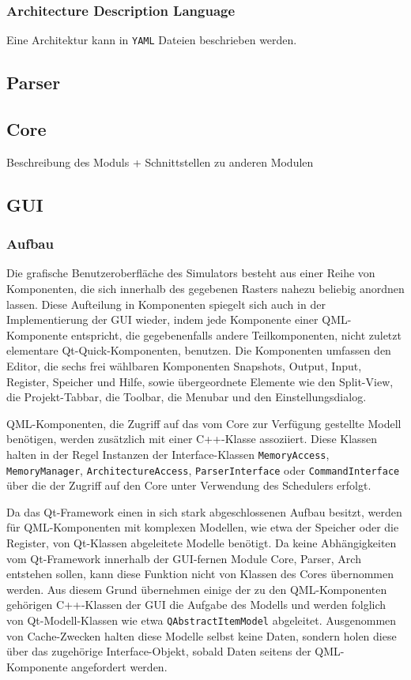 \subsubsection{Architecture Description Language}

Eine Architektur kann in \texttt{YAML} Dateien beschrieben werden.


\subsection{Parser}

\subsection{Core}

Beschreibung des Moduls + Schnittstellen zu anderen Modulen

\subsection{GUI}


\subsubsection{Aufbau}

Die grafische Benutzeroberfläche des Simulators besteht aus einer Reihe von Komponenten, die sich innerhalb des gegebenen Rasters nahezu beliebig anordnen lassen. Diese Aufteilung in Komponenten spiegelt sich auch in der Implementierung der GUI wieder, indem jede Komponente einer QML-Komponente entspricht, die gegebenenfalls andere Teilkomponenten, nicht zuletzt elementare Qt-Quick-Komponenten, benutzen. Die Komponenten umfassen den Editor, die sechs frei wählbaren Komponenten Snapshots, Output, Input, Register, Speicher und Hilfe, sowie übergeordnete Elemente wie den Split-View, die Projekt-Tabbar, die Toolbar, die Menubar und den Einstellungsdialog.

QML-Komponenten, die Zugriff auf das vom Core zur Verfügung gestellte Modell benötigen, werden zusätzlich mit einer C++-Klasse assoziiert. Diese Klassen halten in der Regel Instanzen der Interface-Klassen \texttt{MemoryAccess}, \texttt{MemoryManager}, \texttt{ArchitectureAccess}, \texttt{ParserInterface} oder \texttt{CommandInterface}  über die der Zugriff auf den Core unter Verwendung des Schedulers erfolgt.

Da das Qt-Framework einen in sich stark abgeschlossenen Aufbau besitzt, werden für QML-Komponenten mit komplexen Modellen, wie etwa der Speicher oder die Register, von Qt-Klassen abgeleitete Modelle benötigt. Da keine Abhängigkeiten vom Qt-Framework innerhalb der GUI-fernen Module Core, Parser, Arch entstehen sollen, kann diese Funktion nicht von Klassen des Cores übernommen werden. Aus diesem Grund übernehmen einige der zu den QML-Komponenten gehörigen C++-Klassen der GUI die Aufgabe des Modells und werden folglich von Qt-Modell-Klassen wie etwa \texttt{QAbstractItemModel} abgeleitet. Ausgenommen von Cache-Zwecken halten diese Modelle selbst keine Daten, sondern holen diese über das zugehörige Interface-Objekt, sobald Daten seitens der QML-Komponente angefordert werden.

